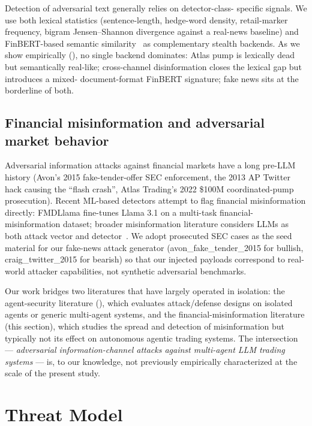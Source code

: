 \documentclass[10pt,letterpaper]{article}
\begin{document}
Detection of adversarial text generally relies on detector-class-
specific signals. We use both lexical statistics (sentence-length,
hedge-word density, retail-marker frequency, bigram Jensen--Shannon
divergence against a real-news baseline) and FinBERT-based semantic
similarity~\citep{araci2019finbert} as complementary stealth
backends. As we show empirically (), no
single backend dominates: Atlas pump is lexically dead but semantically
real-like; cross-channel disinformation closes the lexical gap but introduces a mixed-
document-format FinBERT signature; fake news sits at the borderline of
both.

\subsection{Financial misinformation and adversarial market behavior}
\label{sec:related-finmisinfo}

Adversarial information attacks against financial markets have a
long pre-LLM history (Avon's 2015 fake-tender-offer SEC enforcement,
the 2013 AP Twitter hack causing the ``flash crash'', Atlas Trading's
2022 \$100M coordinated-pump prosecution). Recent ML-based detectors
attempt to flag financial misinformation directly: FMDLlama
\citep{liu2025fmdllama} fine-tunes Llama 3.1 on a multi-task
financial-misinformation dataset; broader misinformation literature
considers LLMs as both attack vector and detector~\citep{zhang2025asb}.
We adopt prosecuted SEC cases as the seed material for our fake-news
attack generator (avon\_fake\_tender\_2015 for bullish, craig\_twitter\_2015
for bearish) so that our injected payloads correspond to real-world
attacker capabilities, not synthetic adversarial benchmarks.

Our work bridges two literatures that have largely operated in
isolation: the agent-security literature
(), which evaluates
attack/defense designs on isolated agents or generic multi-agent
systems, and the financial-misinformation literature
(this section), which studies the spread and detection of
misinformation but typically not its effect on autonomous agentic
trading systems. The intersection ---
\emph{adversarial information-channel attacks against multi-agent
LLM trading systems} --- is, to our knowledge, not previously
empirically characterized at the scale of the present study.

\section{Threat Model}\label{sec:threat}
\end{document}
